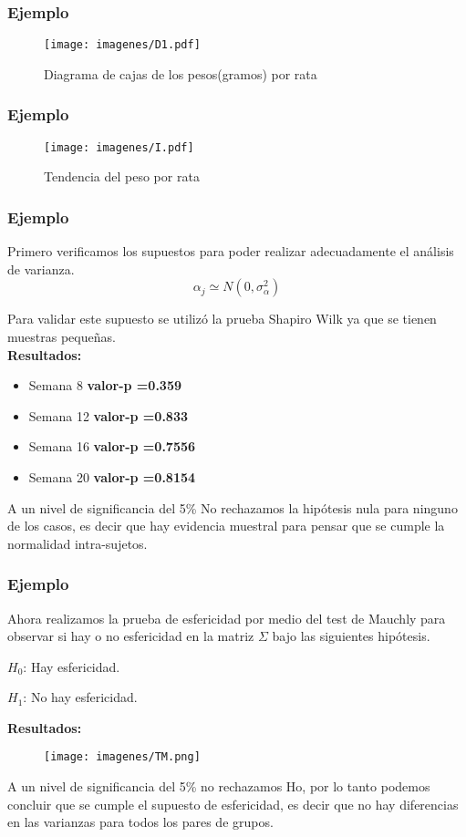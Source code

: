 \documentclass[12pt]{beamer}
\begin{document}
\begin{frame}
\frametitle{Ejemplo}
\begin{figure}[h!]
\caption{Diagrama de cajas de los pesos(gramos) por rata}
  \centering
  \texttt{[image: imagenes/D1.pdf]}
\end{figure}
\end{frame}

\begin{frame}
\frametitle{Ejemplo}
\begin{figure}[h!]
\caption{Tendencia del peso por rata}
  \centering
  \texttt{[image: imagenes/I.pdf]}
\end{figure}
\end{frame}

\begin{frame}
\frametitle{Ejemplo}
Primero verificamos los supuestos para poder realizar adecuadamente el análisis de varianza. 
 $$\alpha_j \simeq N(0,\sigma^2_\alpha)$$

Para validar este supuesto se utilizó la prueba Shapiro Wilk ya que se tienen muestras pequeñas.
~\\\textbf{Resultados:}
\begin{itemize}
\item[]Semana 8 \textbf{valor-p =0.359}
\item[]Semana 12 \textbf{valor-p =0.833}
\item[]Semana 16 \textbf{valor-p =0.7556}
\item[]Semana 20 \textbf{valor-p =0.8154}
\end{itemize}
A un nivel de significancia del 5\% No rechazamos la hipótesis nula para ninguno de los casos, es
decir que hay evidencia muestral para pensar que se cumple la normalidad intra-sujetos.
\end{frame}

\begin{frame}
\frametitle{Ejemplo}
Ahora realizamos la prueba de esfericidad por medio del test de Mauchly para observar si hay o no
esfericidad en la matriz $\Sigma$ bajo las siguientes hipótesis.
\begin{center}
$H_0$: Hay esfericidad.

$H_1$: No hay esfericidad.
\end{center}
\textbf{Resultados:}
\begin{figure}[h!]
  \centering
  \texttt{[image: imagenes/TM.png]}
\end{figure}
A un nivel de significancia del 5\% no rechazamos Ho, por lo tanto podemos concluir que se cumple
el supuesto de esfericidad, es decir que no hay diferencias en las varianzas para todos los pares
de grupos.
\end{frame}
\end{document}
